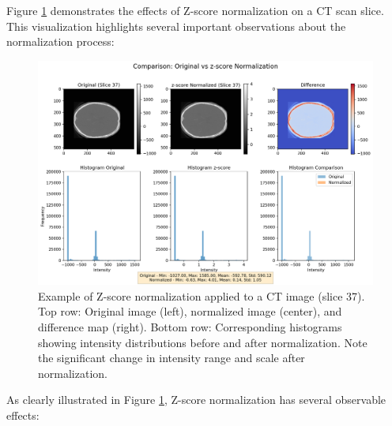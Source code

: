 Figure \ref{fig:normalization_example} demonstrates the effects of Z-score normalization on a CT scan slice. This visualization highlights several important observations about the normalization process:

\begin{figure}[htbp]
    \centering
    \includegraphics[width=\textwidth]{figures/normalization_example.png}
    \caption{Example of Z-score normalization applied to a CT image (slice 37). Top row: Original image (left), normalized image (center), and difference map (right). Bottom row: Corresponding histograms showing intensity distributions before and after normalization. Note the significant change in intensity range and scale after normalization.}
    \label{fig:normalization_example}
\end{figure}

As clearly illustrated in Figure \ref{fig:normalization_example}, Z-score normalization has several observable effects:

